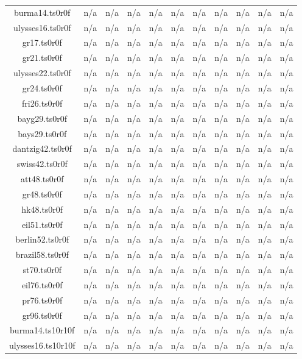 \begin{table}[htbp]
\begin{tabular}{|ccccccccccc|}
burma14.ts0r0f & n/a & n/a & n/a & n/a & n/a & n/a & n/a & n/a & n/a & n/a \\
ulysses16.ts0r0f & n/a & n/a & n/a & n/a & n/a & n/a & n/a & n/a & n/a & n/a \\
gr17.ts0r0f & n/a & n/a & n/a & n/a & n/a & n/a & n/a & n/a & n/a & n/a \\
gr21.ts0r0f & n/a & n/a & n/a & n/a & n/a & n/a & n/a & n/a & n/a & n/a \\
ulysses22.ts0r0f & n/a & n/a & n/a & n/a & n/a & n/a & n/a & n/a & n/a & n/a \\
gr24.ts0r0f & n/a & n/a & n/a & n/a & n/a & n/a & n/a & n/a & n/a & n/a \\
fri26.ts0r0f & n/a & n/a & n/a & n/a & n/a & n/a & n/a & n/a & n/a & n/a \\
bayg29.ts0r0f & n/a & n/a & n/a & n/a & n/a & n/a & n/a & n/a & n/a & n/a \\
bays29.ts0r0f & n/a & n/a & n/a & n/a & n/a & n/a & n/a & n/a & n/a & n/a \\
dantzig42.ts0r0f & n/a & n/a & n/a & n/a & n/a & n/a & n/a & n/a & n/a & n/a \\
swiss42.ts0r0f & n/a & n/a & n/a & n/a & n/a & n/a & n/a & n/a & n/a & n/a \\
att48.ts0r0f & n/a & n/a & n/a & n/a & n/a & n/a & n/a & n/a & n/a & n/a \\
gr48.ts0r0f & n/a & n/a & n/a & n/a & n/a & n/a & n/a & n/a & n/a & n/a \\
hk48.ts0r0f & n/a & n/a & n/a & n/a & n/a & n/a & n/a & n/a & n/a & n/a \\
eil51.ts0r0f & n/a & n/a & n/a & n/a & n/a & n/a & n/a & n/a & n/a & n/a \\
berlin52.ts0r0f & n/a & n/a & n/a & n/a & n/a & n/a & n/a & n/a & n/a & n/a \\
brazil58.ts0r0f & n/a & n/a & n/a & n/a & n/a & n/a & n/a & n/a & n/a & n/a \\
st70.ts0r0f & n/a & n/a & n/a & n/a & n/a & n/a & n/a & n/a & n/a & n/a \\
eil76.ts0r0f & n/a & n/a & n/a & n/a & n/a & n/a & n/a & n/a & n/a & n/a \\
pr76.ts0r0f & n/a & n/a & n/a & n/a & n/a & n/a & n/a & n/a & n/a & n/a \\
gr96.ts0r0f & n/a & n/a & n/a & n/a & n/a & n/a & n/a & n/a & n/a & n/a \\
burma14.ts10r10f & n/a & n/a & n/a & n/a & n/a & n/a & n/a & n/a & n/a & n/a \\
ulysses16.ts10r10f & n/a & n/a & n/a & n/a & n/a & n/a & n/a & n/a & n/a & n/a \\

\end{tabular}
\end{table}
